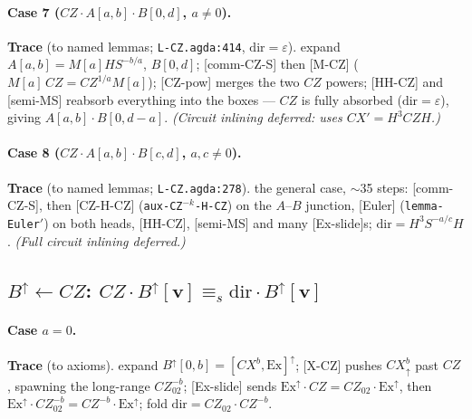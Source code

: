\documentclass[a4paper]{article}
\newcommand{\lem}[1]{\textsf{[#1]}}      %
\begin{document}
\paragraph{Case 7 \;($CZ\cdot A[a,b]\cdot B[0,d]$, $a\neq0$).}
\begin{center}\end{center}
\textbf{Trace} (to named lemmas; \texttt{L-CZ.agda:414}, $\mathrm{dir}=\varepsilon$). expand $A[a,b]=M[a]HS^{-b/a}$, $B[0,d]$; \lem{comm-CZ-S} then \lem{M-CZ} ($M[a]\,CZ=CZ^{1/a}M[a]$); \lem{CZ-pow} merges the two $CZ$ powers; \lem{HH-CZ} and \lem{semi-MS} reabsorb everything into the boxes --- $CZ$ is fully absorbed ($\mathrm{dir}=\varepsilon$), giving $A[a,b]\cdot B[0,d-a]$. \emph{(Circuit inlining deferred: uses $CX'=H^3CZH$.)}

\paragraph{Case 8 \;($CZ\cdot A[a,b]\cdot B[c,d]$, $a,c\neq0$).}
\begin{center}\end{center}
\textbf{Trace} (to named lemmas; \texttt{L-CZ.agda:278}). the general case, $\sim$35 steps: \lem{comm-CZ-S}, then \lem{CZ-H-CZ} (\texttt{aux-CZ$^{-k}$-H-CZ}) on the $A$--$B$ junction, \lem{Euler} (\texttt{lemma-Euler$'$}) on both heads, \lem{HH-CZ}, \lem{semi-MS} and many \lem{Ex-slide}s; $\mathrm{dir}=H^3 S^{-a/c} H$. \emph{(Full circuit inlining deferred.)}

\subsection{$B^{\uparrow}\leftarrow CZ$: \; $CZ\cdot B^{\uparrow}[\mathbf v]\equiv_s \mathrm{dir}\cdot B^{\uparrow}[\mathbf v]$}
\begin{center}\end{center}
\paragraph{Case $a=0$.}
\begin{center}\end{center}
\textbf{Trace} (to axioms). expand $B^{\uparrow}[0,b]=[CX^b,\mathrm{Ex}]^{\uparrow}$; \lem{X-CZ} pushes $CX^b_\uparrow$ past $CZ$, spawning the long-range $CZ_{02}^{-b}$; \lem{Ex-slide} sends $\mathrm{Ex}^{\uparrow}\!\cdot CZ=CZ_{02}\cdot\mathrm{Ex}^{\uparrow}$, then $\mathrm{Ex}^{\uparrow}\!\cdot CZ_{02}^{-b}=CZ^{-b}\cdot\mathrm{Ex}^{\uparrow}$; fold $\mathrm{dir}=CZ_{02}\cdot CZ^{-b}$.
\end{document}
